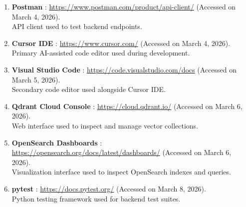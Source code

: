 \begin{enumerate}[leftmargin=0pt]
  \item \label{web:postman} \textbf{Postman} :
        \url{https://www.postman.com/product/api-client/} (Accessed on March 4, 2026).\\
        API client used to test backend endpoints.

  \item \label{web:cursor} \textbf{Cursor IDE} :
        \url{https://www.cursor.com/} (Accessed on March 4, 2026).\\
        Primary AI-assisted code editor used during development.

  \item \label{web:vscode} \textbf{Visual Studio Code} :
        \url{https://code.visualstudio.com/docs} (Accessed on March 5, 2026).\\
        Secondary code editor used alongside Cursor IDE.

  \item \label{web:qdrant_cloud_console} \textbf{Qdrant Cloud Console} :
        \url{https://cloud.qdrant.io/} (Accessed on March 6, 2026).\\
        Web interface used to inspect and manage vector collections.

  \item \label{web:opensearch_dashboards} \textbf{OpenSearch Dashboards} :
        \url{https://opensearch.org/docs/latest/dashboards/} (Accessed on March 6, 2026).\\
        Visualization interface used to inspect OpenSearch indexes and queries.

  \item \label{web:pytest} \textbf{pytest} :
        \url{https://docs.pytest.org/} (Accessed on March 8, 2026).\\
        Python testing framework used for backend test suites.

\end{enumerate}
